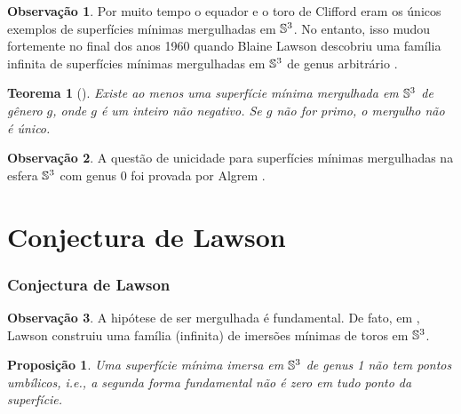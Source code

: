 \documentclass[10pt,a4paper]{beamer}
\newtheorem{teorema}{Teorema}
\newtheorem{proposicao}{Proposição}
\theoremstyle{definition}
\newtheorem{observacao}{Observação}
\begin{document}
\begin{frame}
	
	
	\begin{observacao}
		Por muito tempo o equador e o toro de Clifford eram os únicos exemplos de superfícies mínimas mergulhadas em $\mathbb{S}^3$. No entanto, isso mudou fortemente no final dos
		anos 1960 quando Blaine Lawson descobriu uma família infinita de superfícies mínimas
		mergulhadas em $\mathbb{S}^3$ de genus arbitrário \cite{Lawson1970}.
	\end{observacao}
	
	\pause
	
	\begin{teorema}[\cite{Lawson1970}]
		Existe ao menos uma superfície mínima mergulhada em $\mathbb{S}^3$	de gênero $g$, onde $g$ é um inteiro não negativo. Se $g$ não for primo, o mergulho não é único.
	\end{teorema}
	
	\pause
	
	\begin{observacao}
		A questão de unicidade para superfícies mínimas mergulhadas na esfera $\mathbb{S}^3$ com genus $0$ foi provada por Algrem \cite{Almgren1966}.
	\end{observacao}
\end{frame}


\section{Conjectura de Lawson}

\begin{frame}
	\frametitle{Conjectura de Lawson}
	

	\begin{observacao}
		A hipótese de ser mergulhada é fundamental. De fato, em \cite{Lawson1969}, Lawson construiu uma família (infinita) de imersões mínimas de toros em $\mathbb{S}^3$. 
	\end{observacao}

	\pause

	\begin{proposicao}%
		\label{sup-min-nao-tem-pontos-umbilicos}
		Uma superfície mínima imersa em $\mathbb{S}^3$ de genus 1 não tem pontos umbílicos, i.e., a segunda forma fundamental não é zero em tudo ponto da superfície.
	\end{proposicao}

\end{frame}
\end{document}
